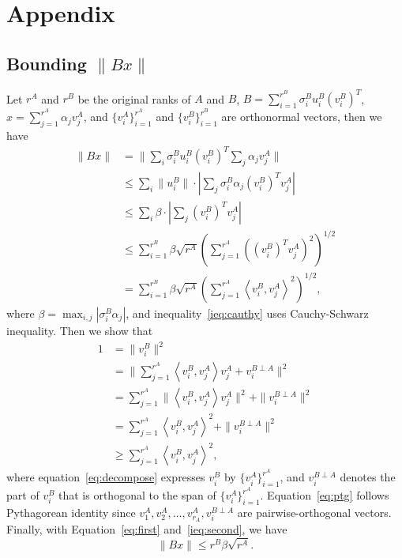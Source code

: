 \newpage
\cleardoublepage
\appendix

\section{Appendix}
\subsection{Bounding $\|Bx\|$}
\label{subsec:bound}
Let $r^A$ and $r^B$ be the original ranks of $A$ and $B$, $B=\sum_{i=1}^{r^B}\sigma_i^B u_i^B (v_i^B)^T$, $x=\sum_{j=1}^{r^A} \alpha_j v_j^A$, and $\{v_i^A\}_{i=1}^{r^A}$ and $\{v_i^B\}_{i=1}^{r^B}$ are orthonormal vectors, then we have
\begin{align}
    \|Bx\|&=\|\sum_i\sigma_i^B u_i^B (v_i^B)^T \sum_j \alpha_j v_j^A\| \nonumber\\
    &\leq \sum_i \|u_i^B\| \cdot |\sum_j \sigma_i^B\alpha_j  (v_i^B)^T   v_j^A| \nonumber\\
    &\leq \sum_i \beta\cdot |\sum_j (v_i^B)^T   v_j^A| \nonumber\\
    &\leq \sum_{i=1}^{r^B} \beta \sqrt{r^A} \left(\sum_{j=1}^{r^A} \left(\left(v_i^B\right)^T   v_j^A\right)^2\right)^{1/2} \label{ieq:cauthy}\\
    &= \sum_{i=1}^{r^B} \beta \sqrt{r^A} \left(\sum_{j=1}^{r^A} \left<v_i^B,   v_j^A\right>^2\right)^{1/2},\label{eq:first}
\end{align}
where $\beta=\max_{i,j}|\sigma_i^B\alpha_j|$, and inequality~\eqref{ieq:cauthy} uses Cauchy-Schwarz inequality. Then we show that
\begin{align}
    1 &= \|v_i^B\|^2 \nonumber\\
    &=\|\sum_{j=1}^{r^A}\left<v_i^B,   v_j^A\right> v_j^A + v_i^{B\perp A}\|^2 \label{eq:decompose}\\
    &=\sum_{j=1}^{r^A} \|\left<v_i^B,   v_j^A\right> v_j^A\|^2 + \|v_i^{B\perp A}\|^2 \label{eq:ptg}\\
    &= \sum_{j=1}^{r^A} \left<v_i^B,   v_j^A\right>^2 + \|v_i^{B\perp A}\|^2 \nonumber\\
    &\geq \sum_{j=1}^{r^A} \left<v_i^B,   v_j^A\right>^2, \label{ieq:second}
\end{align}
where equation~\eqref{eq:decompose} expresses $v_i^B$ by $\{v_i^A\}_{i=1}^{r^A}$, and $v_i^{B\perp A}$ denotes the part of $v_i^B$ that is orthogonal to the span of $\{v_i^A\}_{i=1}^{r^A}$. Equation~\eqref{eq:ptg} follows Pythagorean identity since $v_1^A, v_2^A,\ldots,v_{r_A}^A, v_i^{B\perp A}$ are pairwise-orthogonal vectors. Finally, with Equation~\eqref{eq:first} and~\eqref{ieq:second}, we have
\[
\|Bx\|\leq r^B\beta \sqrt{r^A} .
\]

